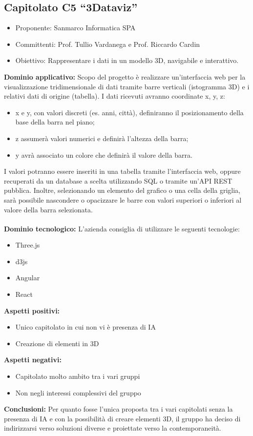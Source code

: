 \documentclass[10pt]{article}
\begin{document}
\subsection{Capitolato C5 “3Dataviz”}
\begin{itemize}
    \item Proponente: Sanmarco Informatica SPA
    \item Committenti: Prof. Tullio Vardanega e Prof. Riccardo Cardin
    \item Obiettivo: Rappresentare i dati in un modello 3D, navigabile e interattivo.
\end{itemize}
\textbf{Dominio applicativo:}
Scopo del progetto è realizzare un'interfaccia web per la visualizzazione tridimensionale di dati tramite barre verticali (istogramma 3D) e i relativi dati di origine (tabella).
I dati ricevuti avranno coordinate x, y, z:
\begin{itemize}
    \item x e y, con valori discreti (es. anni, città), definiranno il posizionamento della base della barra nel piano;
    \item z assumerà valori numerici e definirà l'altezza della barra;
    \item y avrà associato un colore che definirà il valore della barra.
\end{itemize}
I valori potranno essere inseriti in una tabella tramite l'interfaccia web, oppure recuperati da un database a scelta utilizzando SQL o tramite un'API REST pubblica. Inoltre, selezionando un elemento del grafico o una cella della griglia, sarà possibile nascondere o opacizzare le barre con valori superiori o inferiori al valore della barra selezionata.\\
\\
\textbf{Dominio tecnologico:}
L'azienda consiglia di utilizzare le seguenti tecnologie:
\begin{itemize}
    \item Three.js
    \item d3js
    \item Angular
    \item React
\end{itemize}
\textbf{Aspetti positivi:}
\begin{itemize}
    \item Unico capitolato in cui non vi è presenza di IA
    \item Creazione di elementi in 3D
\end{itemize}
\textbf{Aspetti negativi:}
\begin{itemize}
    \item Capitolato molto ambito tra i vari gruppi
    \item Non negli interessi complessivi del gruppo
\end{itemize}
\textbf{Conclusioni:}
Per quanto fosse l’unica proposta tra i vari capitolati senza la presenza di IA e con la possibilità di creare elementi 3D, il gruppo ha deciso di indirizzarsi verso soluzioni diverse e proiettate verso la contemporaneità.
\end{document}
